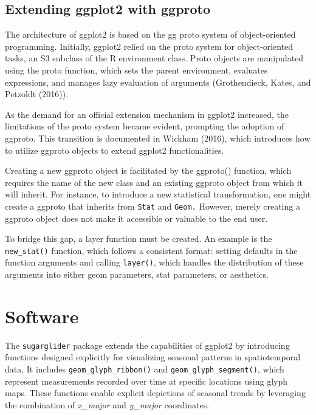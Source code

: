 \hypertarget{extending-ggplot2-with-ggproto}{%
\subsection{Extending ggplot2 with ggproto}\label{extending-ggplot2-with-ggproto}}

The architecture of ggplot2 is based on the gg proto system of object-oriented programming. Initially, ggplot2 relied on the proto system for object-oriented tasks, an S3 subclass of the R environment class. Proto objects are manipulated using the proto function, which sets the parent environment, evaluates expressions, and manages lazy evaluation of arguments (Grothendieck, Kates, and Petzoldt (2016)).

As the demand for an official extension mechanism in ggplot2 increased, the limitations of the proto system became evident, prompting the adoption of ggproto. This transition is documented in Wickham (2016), which introduces how to utilize ggproto objects to extend ggplot2 functionalities.

Creating a new ggproto object is facilitated by the ggproto() function, which requires the name of the new class and an existing ggproto object from which it will inherit. For instance, to introduce a new statistical transformation, one might create a ggproto that inherits from \texttt{Stat} and \texttt{Geom.} However, merely creating a ggproto object does not make it accessible or valuable to the end user.

To bridge this gap, a layer function must be created. An example is the \texttt{new\_stat()} function, which follows a consistent format: setting defaults in the function arguments and calling \texttt{layer()}, which handles the distribution of these arguments into either geom parameters, stat parameters, or aesthetics.

\hypertarget{software}{%
\section{Software}\label{software}}

The \texttt{sugarglider} package extends the capabilities of ggplot2 by introducing functions designed explicitly for visualizing seasonal patterns in spatiotemporal data. It includes \texttt{geom\_glyph\_ribbon()} and \texttt{geom\_glyph\_segment()}, which represent measurements recorded over time at specific locations using glyph maps. These functions enable explicit depictions of seasonal trends by leveraging the combination of \emph{x\_major} and \emph{y\_major} coordinates.

